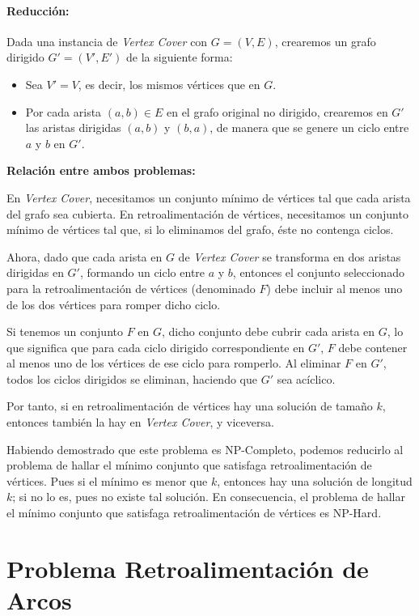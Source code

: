 \documentclass[12pt]{article}
\begin{document}
\paragraph{Reducción:}
Dada una instancia de \textit{Vertex Cover} con $G = (V, E)$, crearemos un grafo dirigido 
$G' = (V', E')$ de la siguiente forma:
\begin{itemize}
  \item Sea $V' = V$, es decir, los mismos vértices que en $G$.
  \item Por cada arista $(a, b) \in E$ en el grafo original no dirigido, crearemos en $G'$ 
  las aristas dirigidas $(a, b)$ y $(b, a)$, de manera que se genere un ciclo entre 
  $a$ y $b$ en $G'$.
\end{itemize}

\bigskip

\noindent
\textbf{Relación entre ambos problemas:}

\noindent
En \textit{Vertex Cover}, necesitamos un conjunto mínimo de vértices tal que cada arista 
del grafo sea cubierta. En retroalimentación de vértices, necesitamos un conjunto mínimo 
de vértices tal que, si lo eliminamos del grafo, éste no contenga ciclos.

Ahora, dado que cada arista en $G$ de \textit{Vertex Cover} se transforma en dos aristas 
dirigidas en $G'$, formando un ciclo entre $a$ y $b$, entonces el conjunto seleccionado 
para la retroalimentación de vértices (denominado $F$) debe incluir al menos uno de 
los dos vértices para romper dicho ciclo.

Si tenemos un conjunto $F$ en $G$, dicho conjunto debe cubrir cada arista en $G$, lo que 
significa que para cada ciclo dirigido correspondiente en $G'$, $F$ debe contener al menos 
uno de los vértices de ese ciclo para romperlo. Al eliminar $F$ en $G'$, todos los ciclos 
dirigidos se eliminan, haciendo que $G'$ sea acíclico. 

Por tanto, si en retroalimentación de vértices hay una solución de tamaño $k$, entonces 
también la hay en \textit{Vertex Cover}, y viceversa. 

Habiendo demostrado que este problema es NP-Completo, podemos reducirlo al problema 
de hallar el mínimo conjunto que satisfaga retroalimentación de vértices. Pues si el 
mínimo es menor que $k$, entonces hay una solución de longitud $k$; si no lo es, pues 
no existe tal solución. En consecuencia, el problema de hallar el mínimo conjunto que 
satisfaga retroalimentación de vértices es NP-Hard.


\section*{Problema Retroalimentación de Arcos}
\end{document}

